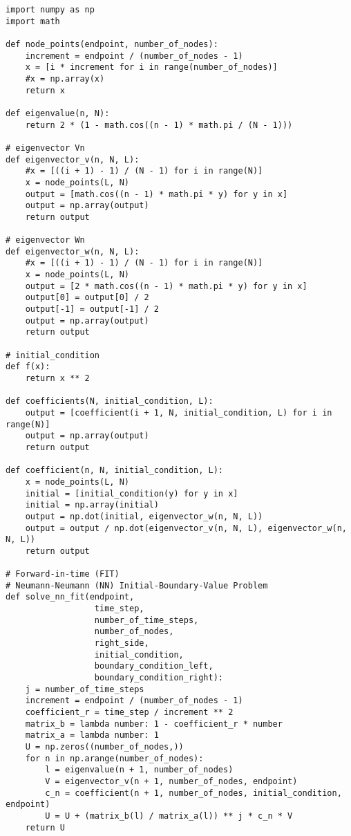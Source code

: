 \documentclass{amsbook}%
\theoremstyle{plain}
\numberwithin{equation}{section}
\begin{document}
\begin{small}
\begin{verbatim}
import numpy as np
import math

def node_points(endpoint, number_of_nodes):
    increment = endpoint / (number_of_nodes - 1)
    x = [i * increment for i in range(number_of_nodes)]
    #x = np.array(x)
    return x

def eigenvalue(n, N):
    return 2 * (1 - math.cos((n - 1) * math.pi / (N - 1)))

# eigenvector Vn
def eigenvector_v(n, N, L):
    #x = [((i + 1) - 1) / (N - 1) for i in range(N)]
    x = node_points(L, N) 
    output = [math.cos((n - 1) * math.pi * y) for y in x]
    output = np.array(output)
    return output

# eigenvector Wn
def eigenvector_w(n, N, L):
    #x = [((i + 1) - 1) / (N - 1) for i in range(N)]
    x = node_points(L, N)
    output = [2 * math.cos((n - 1) * math.pi * y) for y in x]
    output[0] = output[0] / 2
    output[-1] = output[-1] / 2
    output = np.array(output)
    return output

# initial_condition
def f(x):
    return x ** 2

def coefficients(N, initial_condition, L):
    output = [coefficient(i + 1, N, initial_condition, L) for i in range(N)]
    output = np.array(output)
    return output
    
def coefficient(n, N, initial_condition, L):
    x = node_points(L, N)
    initial = [initial_condition(y) for y in x]
    initial = np.array(initial)
    output = np.dot(initial, eigenvector_w(n, N, L))
    output = output / np.dot(eigenvector_v(n, N, L), eigenvector_w(n, N, L))
    return output

# Forward-in-time (FIT)
# Neumann-Neumann (NN) Initial-Boundary-Value Problem
def solve_nn_fit(endpoint,
                  time_step,
                  number_of_time_steps,
                  number_of_nodes,
                  right_side,
                  initial_condition,
                  boundary_condition_left,
                  boundary_condition_right):
    j = number_of_time_steps
    increment = endpoint / (number_of_nodes - 1)
    coefficient_r = time_step / increment ** 2
    matrix_b = lambda number: 1 - coefficient_r * number
    matrix_a = lambda number: 1
    U = np.zeros((number_of_nodes,)) 
    for n in np.arange(number_of_nodes):
        l = eigenvalue(n + 1, number_of_nodes)
        V = eigenvector_v(n + 1, number_of_nodes, endpoint)
        c_n = coefficient(n + 1, number_of_nodes, initial_condition, endpoint)
        U = U + (matrix_b(l) / matrix_a(l)) ** j * c_n * V   
    return U


\end{verbatim}
\end{small}
\end{document}
